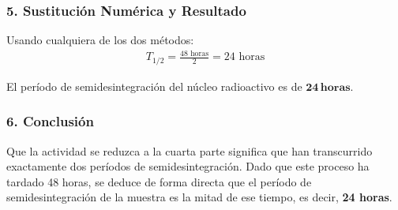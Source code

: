 \subsubsection*{5. Sustitución Numérica y Resultado}
Usando cualquiera de los dos métodos:
\begin{gather}
    T_{1/2} = \frac{48 \text{ horas}}{2} = 24 \text{ horas}
\end{gather}
\begin{cajaresultado}
    El período de semidesintegración del núcleo radioactivo es de $\boldsymbol{24 \, horas}$.
\end{cajaresultado}

\subsubsection*{6. Conclusión}
\begin{cajaconclusion}
    Que la actividad se reduzca a la cuarta parte significa que han transcurrido exactamente dos períodos de semidesintegración. Dado que este proceso ha tardado 48 horas, se deduce de forma directa que el período de semidesintegración de la muestra es la mitad de ese tiempo, es decir, \textbf{24 horas}.
\end{cajaconclusion}

\newpage
